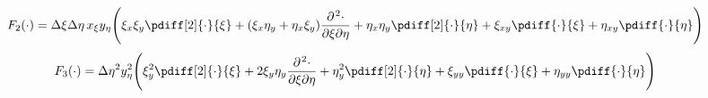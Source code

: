 \begin{align}
    F_2(\cdot) & =
    \Dxi\Deta\, x_\xi y_\eta \Bigg(\xi_x \xi_y \pdiff[2]{\cdot}{\xi}
    + (\xi_x \eta_y + \eta_x \xi_y) \frac{\partial\kern 0.083333em^2 \cdot}{\partial \xi \partial \eta}
    + \eta_x \eta_y \pdiff[2]{\cdot}{\eta}
    + \xi_{xy} \pdiff{\cdot}{\xi}
    + \eta_{xy} \pdiff{\cdot}{\eta}
    \Bigg)
\end{align}
\begin{align}
    F_3(\cdot) & =
    \Deta^2 y_\eta^2 \Bigg(\xi_y^2   \pdiff[2]{\cdot}{\xi}
    + 2 \xi_y \eta_y \frac{\partial\kern 0.083333em^2 \cdot}{\partial \xi \partial \eta}
    + \eta_y^2 \pdiff[2]{\cdot}{\eta}
    + \xi_{yy} \pdiff{\cdot}{\xi}
    + \eta_{yy} \pdiff{\cdot}{\eta}
    \Bigg)
\end{align}
